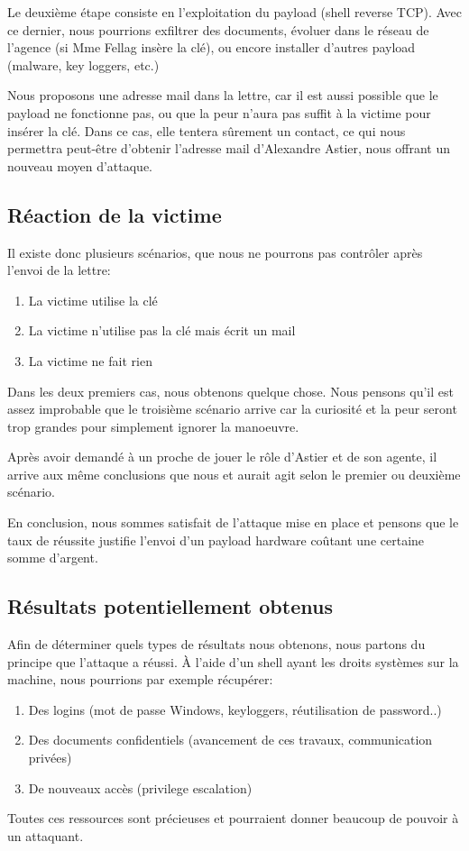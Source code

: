 Le deuxième étape consiste en l'exploitation du payload (shell reverse TCP).
Avec ce dernier, nous pourrions exfiltrer des documents, évoluer dans le réseau de l'agence (si Mme Fellag insère la clé), ou encore installer d'autres
payload (malware, key loggers, etc.)

Nous proposons une adresse mail dans la lettre, car il est aussi possible que le payload ne fonctionne
pas, ou que la peur n'aura pas suffit à la victime pour insérer la clé. Dans ce cas, elle tentera sûrement un contact, ce qui nous permettra peut-être d'obtenir
l'adresse mail d'Alexandre Astier, nous offrant un nouveau moyen d'attaque. 
\subsection{Réaction de la victime}

Il existe donc plusieurs scénarios, que nous ne pourrons pas contrôler après l'envoi de la lettre:
\begin{enumerate}
    \item La victime utilise la clé
    \item La victime n'utilise pas la clé mais écrit un mail
    \item La victime ne fait rien
\end{enumerate}
Dans les deux premiers cas, nous obtenons quelque chose. Nous pensons qu'il est assez improbable que le troisième scénario arrive car la curiosité et la peur seront trop grandes pour
simplement ignorer la manoeuvre.

Après avoir demandé à un proche de jouer le rôle d'Astier et de son agente, il arrive aux même conclusions que nous et aurait agit
selon le premier ou deuxième scénario.

En conclusion, nous sommes satisfait de l'attaque mise en place et pensons que le taux de réussite justifie l'envoi d'un payload hardware coûtant une certaine somme d'argent.
\subsection{Résultats potentiellement obtenus}

Afin de déterminer quels types de résultats nous obtenons, nous partons du principe que l'attaque a réussi.
À l'aide d'un shell ayant les droits systèmes sur la machine, nous pourrions par exemple récupérer:
\begin{enumerate}
    \item Des logins (mot de passe Windows, keyloggers, réutilisation de password..)
    \item Des documents confidentiels (avancement de ces travaux, communication privées)
    \item De nouveaux accès (privilege escalation)
\end{enumerate}
Toutes ces ressources sont précieuses et pourraient donner beaucoup de pouvoir à un attaquant. 